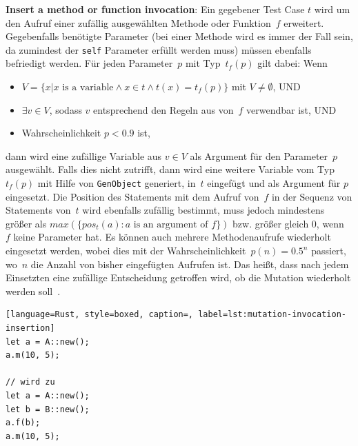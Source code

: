 \documentclass{article}
\begin{document}
\textbf{Insert a method or function invocation}: Ein gegebener Test Case $t$ wird um den Aufruf einer zufällig ausgewählten Methode oder Funktion~$f$ erweitert. Gegebenfalls benötigte Parameter (bei einer Methode wird es immer der Fall sein, da zumindest der \lstinline{self} Parameter erfüllt werden muss) müssen ebenfalls befriedigt werden. Für jeden Parameter~$p$ mit Typ~$t_f(p)$ gilt dabei: Wenn
\begin{itemize}
    \item $V = \{x | x \text{ is a variable} \land x \in t \land t(x) = t_f(p)\}$ mit $V \neq \emptyset$, UND
    \item $\exists v \in V$, sodass $v$ entsprechend den Regeln aus  von~$f$ verwendbar ist, UND
    \item Wahrscheinlichkeit $p < 0.9$ ist,
\end{itemize}
dann wird eine zufällige Variable aus $v \in V$ als Argument für den Parameter~$p$ ausgewählt. Falls dies nicht zutrifft, dann wird eine weitere Variable vom Typ~$t_f(p)$ mit Hilfe von \lstinline{GenObject} generiert, in~$t$ eingefügt und als Argument für $p$ eingesetzt. Die Position des Statements mit dem Aufruf von~$f$ in der Sequenz von Statements von~$t$ wird ebenfalls zufällig bestimmt, muss jedoch mindestens größer als $max(\{pos_t(a) : a \text{ is an argument of } f\})$ bzw. größer gleich $0$, wenn~$f$ keine Parameter hat. Es können auch mehrere Methodenaufrufe wiederholt eingesetzt werden, wobei dies mit der Wahrscheinlichkeit~$p(n) = 0.5^n$ passiert, wo~$n$ die Anzahl von bisher eingefügten Aufrufen ist. Das heißt, dass nach jedem Einsetzten eine zufällige Entscheidung getroffen wird, ob die Mutation wiederholt werden soll~\cite{Tonella2004}.
\begin{lstlisting}[language=Rust, style=boxed, caption=, label=lst:mutation-invocation-insertion]
let a = A::new();
a.m(10, 5);

// wird zu
let a = A::new();
let b = B::new();
a.f(b);
a.m(10, 5);
\end{lstlisting}
\end{document}
